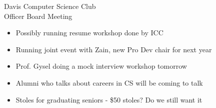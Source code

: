 \documentclass{article}
\begin{document}
\begin{Minutes}{Davis Computer Science Club\\Officer Board Meeting}

\begin {itemize} 
\end {itemize}

\begin {itemize}
\item Possibly running resume workshop done by ICC 
\item Running joint event with Zain, new Pro Dev chair for next year
\item Prof. Gysel doing a mock interview workshop tomorrow
\item Alumni who talks about careers in CS will be coming to talk
\end {itemize}

\begin{itemize}
\end {itemize}

\begin {itemize}
\end {itemize}

\begin {itemize}
\item Stoles for graduating seniors - \$50 stoles? Do we still want it 
\end {itemize}

\end{Minutes}
\thispagestyle{creditfooter}
\end{document}
